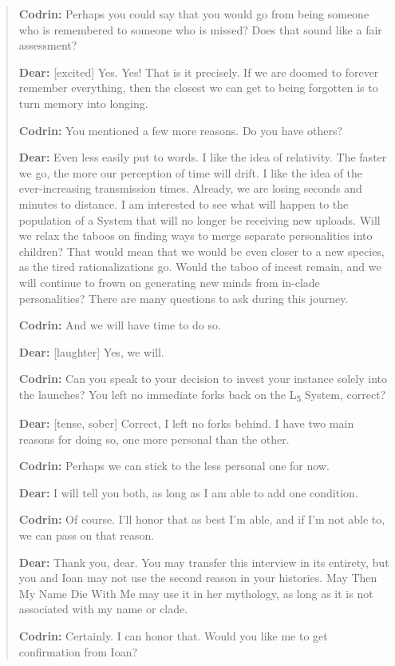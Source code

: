 \begin{quote}
\textbf{Codrin:} Perhaps you could say that you would go from being someone who is remembered to someone who is missed? Does that sound like a fair assessment?

\textbf{Dear:} {[}excited{]} Yes. Yes! That is it precisely. If we are doomed to forever remember everything, then the closest we can get to being forgotten is to turn memory into longing.

\textbf{Codrin:} You mentioned a few more reasons. Do you have others?

\textbf{Dear:} Even less easily put to words. I like the idea of relativity. The faster we go, the more our perception of time will drift. I like the idea of the ever-increasing transmission times. Already, we are losing seconds and minutes to distance. I am interested to see what will happen to the population of a System that will no longer be receiving new uploads. Will we relax the taboos on finding ways to merge separate personalities into children? That would mean that we would be even closer to a new species, as the tired rationalizations go. Would the taboo of incest remain, and we will continue to frown on generating new minds from in-clade personalities? There are many questions to ask during this journey.

\textbf{Codrin:} And we will have time to do so.

\textbf{Dear:} {[}laughter{]} Yes, we will.

\textbf{Codrin:} Can you speak to your decision to invest your instance solely into the launches? You left no immediate forks back on the L\textsubscript{5} System, correct?

\textbf{Dear:} {[}tense, sober{]} Correct, I left no forks behind. I have two main reasons for doing so, one more personal than the other.

\textbf{Codrin:} Perhaps we can stick to the less personal one for now.

\textbf{Dear:} I will tell you both, as long as I am able to add one condition.

\textbf{Codrin:} Of course. I'll honor that as best I'm able, and if I'm not able to, we can pass on that reason.

\textbf{Dear:} Thank you, dear. You may transfer this interview in its entirety, but you and Ioan may not use the second reason in your histories. May Then My Name Die With Me may use it in her mythology, as long as it is not associated with my name or clade.

\textbf{Codrin:} Certainly. I can honor that. Would you like me to get confirmation from Ioan?


\end{quote}
